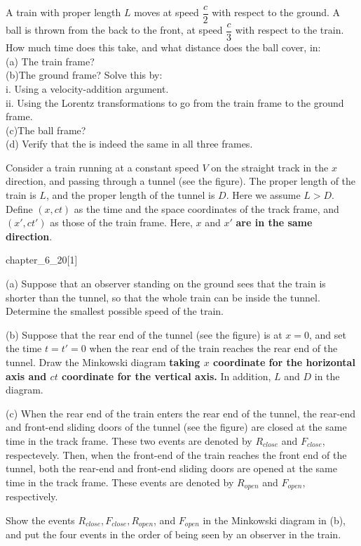 \begin{example}
A train with proper length $L$ moves at speed $\dfrac{c}{2}$ with respect to the ground. A ball is thrown from the back to the front, at speed $\dfrac{c}{3}$ with respect to the train. How much time does this take, and what distance does the ball cover, in:
\\(a) The train frame?
\\(b)The ground frame? Solve this by:
\\\hspace*{2em}i. Using a velocity-addition argument.
\\\hspace*{2em}ii. Using the Lorentz transformations to go from the train
frame to the ground frame.
\\(c)The ball frame?
\\(d) Verify that the  is indeed the same in all three
frames.
\end{example}
\begin{example}
Consider a train running at a constant speed $V$ on the straight track in the $x$ direction, and passing through a tunnel (see the figure). The proper length of the train is $L$, and the proper length of the tunnel is $D$. Here we assume $L>D$. Define $(x,ct)$ as the time and the space coordinates of the track frame, and $(x',ct')$ as those of the train frame. Here, $x$ and $x' $\textbf{ are in the same direction}.
\begin{singlefigure}{chapter_6_20}[1]    
\end{singlefigure}
(a) Suppose that an observer standing on the ground sees that the train is shorter than the tunnel, so that the whole train can be inside the tunnel. Determine the smallest possible speed of the train.

(b) Suppose that the rear end of the tunnel (see the figure) is at $x=0$, and set the time $t=t'=0$ when the rear end of the train reaches the rear end of the tunnel. Draw the Minkowski diagram \textbf{ taking $x$ coordinate for the horizontal axis and $ct$ coordinate for the vertical axis.} In addition,  $L$ and $D$ in the diagram.

(c) When the rear end of the train enters the rear end of the tunnel, the rear-end and front-end sliding doors of the tunnel (see the figure) are closed at the same time in the track frame. These two events are denoted by $R_{close}$ and $F_{close}$, respectevely. Then, when the front-end of the train reaches the front end of the tunnel, both the rear-end and front-end sliding doors are opened at the same time in the track frame. These events are denoted by $R_{open}$ and $F_{open}$, respectively.

Show the events $R_{close},F_{close},R_{open}$, and $F_{open}$ in the Minkowski diagram in (b),
and put the four events in the order of being seen by an observer in the train.
\end{example}
